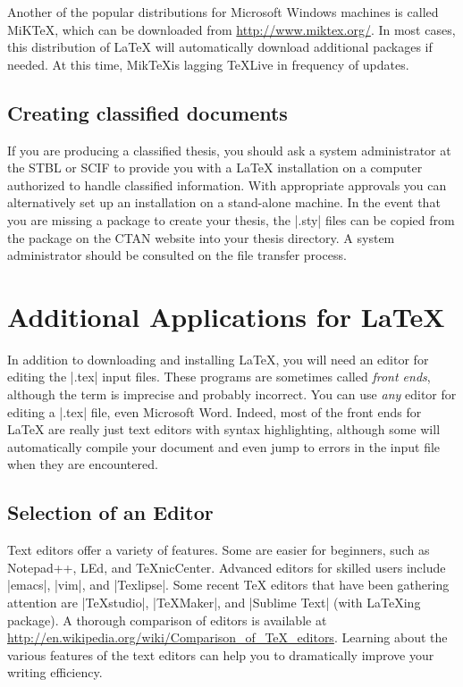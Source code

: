 Another of the popular distributions for Microsoft Windows machines
is called MiK\TeX, which can be downloaded from
\url{http://www.miktex.org/}.  In most cases, this distribution of
\LaTeX{} will automatically download additional packages if needed.
At this time, Mik\TeX is lagging \TeX Live in frequency of updates.

\subsection{Creating classified documents}
If you are producing a classified thesis, you should ask a
system administrator at the STBL or SCIF to provide you with a
\LaTeX{} installation on a computer authorized to handle classified
information. With appropriate approvals you can alternatively set up an
installation on a stand-alone machine.
In the event that you are missing a package to create your thesis, the |.sty| files can be copied from the package on the CTAN website into your thesis directory.  A system administrator should be consulted on the file transfer process.  

\section{Additional Applications for \LaTeX{} }

In addition to downloading and installing \LaTeX, you will need an
editor for editing the |.tex| input files. These programs are
sometimes called \emph{front ends}, although the term is imprecise and
probably incorrect. You can use \emph{any} editor for editing a |.tex|
file, even Microsoft Word. Indeed, most of the front ends for \LaTeX{} 
are really just text editors with syntax highlighting, although some
will automatically compile your document and even jump to errors in
the input file when they are encountered.

\subsection{Selection of an Editor} Text editors offer a variety of features.
Some are easier for beginners, such as Notepad++, LEd, and TeXnicCenter.
Advanced editors for skilled users include |emacs|, |vim|, and |Texlipse|.
Some recent TeX editors that have been gathering attention are |TeXstudio|,
|TeXMaker|, and |Sublime Text| (with LaTeXing package).  A thorough comparison
of editors is available at
\url{http://en.wikipedia.org/wiki/Comparison_of_TeX_editors}.  Learning about
the various features of the text editors can help you to dramatically improve
your writing efficiency.

